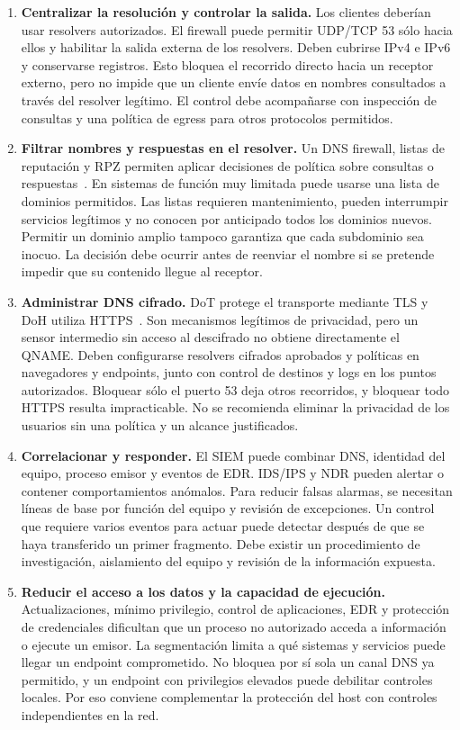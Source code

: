 \documentclass[11pt,a4paper]{article}
\begin{document}
\begin{enumerate}[leftmargin=*]
\item \textbf{Centralizar la resolución y controlar la salida.} Los clientes
deberían usar resolvers autorizados. El firewall puede permitir UDP/TCP 53
sólo hacia ellos y habilitar la salida externa de los resolvers. Deben
cubrirse IPv4 e IPv6 y conservarse registros. Esto bloquea el recorrido
directo hacia un receptor externo, pero no impide que un cliente envíe datos
en nombres consultados a través del resolver legítimo. El control debe
acompañarse con inspección de consultas y una política de egress para otros
protocolos permitidos.

\item \textbf{Filtrar nombres y respuestas en el resolver.} Un DNS firewall,
listas de reputación y RPZ permiten aplicar decisiones de política sobre
consultas o respuestas~\cite{rpz}. En sistemas de función muy limitada puede
usarse una lista de dominios permitidos. Las listas requieren mantenimiento,
pueden interrumpir servicios legítimos y no conocen por anticipado todos
los dominios nuevos. Permitir un dominio amplio tampoco garantiza que cada
subdominio sea inocuo. La decisión debe ocurrir antes de reenviar el nombre
si se pretende impedir que su contenido llegue al receptor.

\item \textbf{Administrar DNS cifrado.} DoT protege el transporte mediante
TLS y DoH utiliza HTTPS~\cite{rfc7858,rfc8484}. Son mecanismos legítimos de
privacidad, pero un sensor intermedio sin acceso al descifrado no obtiene
directamente el QNAME. Deben configurarse resolvers cifrados aprobados y
políticas en navegadores y endpoints, junto con control de destinos y logs
en los puntos autorizados. Bloquear sólo el puerto 53 deja otros recorridos,
y bloquear todo HTTPS resulta impracticable. No se recomienda eliminar la
privacidad de los usuarios sin una política y un alcance justificados.

\item \textbf{Correlacionar y responder.} El SIEM puede combinar DNS,
identidad del equipo, proceso emisor y eventos de EDR. IDS/IPS y NDR pueden
alertar o contener comportamientos anómalos. Para reducir falsas alarmas,
se necesitan líneas de base por función del equipo y revisión de excepciones.
Un control que requiere varios eventos para actuar puede detectar después
de que se haya transferido un primer fragmento. Debe existir un procedimiento
de investigación, aislamiento del equipo y revisión de la información expuesta.

\item \textbf{Reducir el acceso a los datos y la capacidad de ejecución.}
Actualizaciones, mínimo privilegio, control de aplicaciones, EDR y protección
de credenciales dificultan que un proceso no autorizado acceda a información
o ejecute un emisor. La segmentación limita a qué sistemas y servicios puede
llegar un endpoint comprometido. No bloquea por sí sola un canal DNS ya
permitido, y un endpoint con privilegios elevados puede debilitar controles
locales. Por eso conviene complementar la protección del host con controles
independientes en la red.
\end{enumerate}
\end{document}
